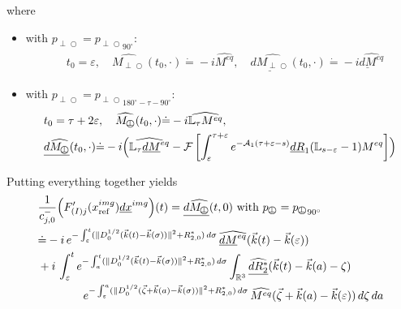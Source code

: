 \documentclass{ws-m3as}
\newcommand{\uld}[1]{\underline{d#1}}
\def\Mpp{M_{\perp\!\!\!\!\!\bigcirc}}
\def\Mphp{\widehat{\Mpp}}
\def\pp{p_{\perp\!\!\!\!\!\bigcirc}}
\newcommand\taup{\varepsilon}
\newcommand{\Dterm}[1]{\|D_0^{1/2}{#1}\|^2}
\begin{document}
where
\begin{itemize}
\item with $\pp={\pp}_{90^\circ}$:
\begin{equation*}
\begin{aligned}
&t_0=\taup , \quad
\Mphp(t_0,\cdot)\dot{=}-i\widehat{M^{eq}}, \quad
\uld{\Mphp}(t_0,\cdot)\dot{=}-i\widehat{\uld{M}^{eq}}
\end{aligned}
\end{equation*}
\item with $\pp={\pp}_{180^\circ-\tau-90^\circ}$:
\begin{equation*}
\begin{aligned}
&t_0=\tau+2\taup, \quad
\Mphp(t_0,\cdot)\dot{=}
-i\widehat{\mathbb{L}_\tau M^{eq}}, \\
&\uld{\Mphp}(t_0,\cdot)\dot{=}
-i\Bigl(\widehat{\mathbb{L}_\tau \uld{M}^{eq}}
-\mathcal{F}\left[\int_\taup^{\tau+\taup}e^{-\mathcal{A}_1(\tau+\taup-s)}\uld{R}_1(\mathbb{L}_{s-\taup}-1)M^{eq}
\right]\Bigr)
\end{aligned}
\end{equation*}
\end{itemize}
Putting everything together yields 
\begin{equation*}%
\begin{aligned}
&\frac{1}{c_{j,0}^-}\Bigl(F_{(I)j}'(x^{img}_{\text{ref}})\uld{x}^{img}\Bigr)(t)= 
\uld{\Mphp}(t,0) \text{ with }\pp={\pp}_{90^\circ}\\
&\dot{=}
-i\,e^{-\int_{\taup}^t(\Dterm{({\vec k}(t)-\vec k(\sigma))}+R_{2,0}^*)\, d\sigma}\,
\widehat{\uld{M}^{eq}}({\vec k}(t)-{\vec k}(\taup))
\\&+i\,\int_{\taup}^t e^{-\int_a^t(\Dterm{({\vec k}(t)-\vec k(\sigma))}+R_{2,0}^*)\, d\sigma}
\int_{\mathbb{R}^3}\widehat{\uld{R_2^*}}({\vec k}(t)-{\vec k}(a)-\zeta)\\
&\qquad\qquad e^{-\int_{\taup}^a(\Dterm{(\vec\zeta+{\vec k}(a)-\vec k(\sigma))} +R_{2,0}^*)\, d\sigma}\,\widehat{M^{eq}}(\vec\zeta+{\vec k}(a)-\vec k(\taup))
\,d\zeta\, da
\end{aligned}
\end{equation*}
\end{document}
